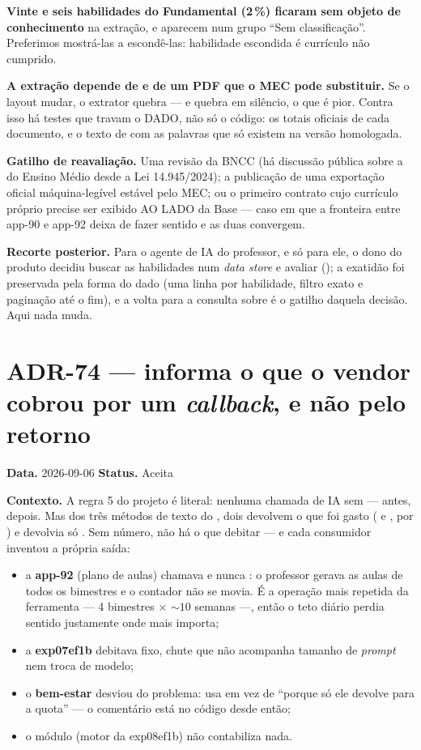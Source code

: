 \textbf{Vinte e seis habilidades do Fundamental (2\,\%) ficaram sem objeto de
conhecimento} na extração, e aparecem num grupo \enquote{Sem classificação}.
Preferimos mostrá-las a escondê-las: habilidade escondida é currículo não
cumprido.

\textbf{A extração depende de  e de um PDF que o MEC pode
substituir.} Se o layout mudar, o extrator quebra --- e quebra em silêncio, o
que é pior. Contra isso há testes que travam o DADO, não só o código: os totais
oficiais de cada documento, e o texto de  com as palavras que só
existem na versão homologada.

\textbf{Gatilho de reavaliação.} Uma revisão da BNCC (há discussão pública sobre
a do Ensino Médio desde a Lei 14.945/2024); a publicação de uma exportação
oficial máquina-legível estável pelo MEC; ou o primeiro contrato cujo currículo
próprio precise ser exibido AO LADO da Base --- caso em que a fronteira entre
app-90 e app-92 deixa de fazer sentido e as duas convergem.

\textbf{Recorte posterior.} Para o agente de IA do professor, e só para ele, o
dono do produto decidiu buscar as habilidades num \emph{data store} e avaliar
(); a exatidão foi preservada pela forma do dado (uma linha por
habilidade, filtro exato e paginação até o fim), e a volta para a consulta sobre
 é o gatilho daquela decisão. Aqui nada muda.
\section{ADR-74 ---  informa o que o vendor cobrou por um
\emph{callback}, e não pelo retorno}
\label{adr:74}

\textbf{Data.} 2026-09-06 \quad \textbf{Status.} Aceita

\textbf{Contexto.} A regra 5 do projeto é literal: nenhuma chamada de IA sem
 ---  antes,  depois. Mas dos três
métodos de texto do , dois devolvem o que foi gasto
( e , por ) e
 devolvia só . Sem número, não há o que debitar --- e
cada consumidor inventou a própria saída:

\begin{itemize}
  \item a \textbf{app-92} (plano de aulas) chamava  e nunca
    : o professor gerava as aulas de todos os bimestres e o
    contador não se movia. É a operação mais repetida da ferramenta --- 4
    bimestres $\times$ ${\sim}10$ semanas ---, então o teto diário perdia
    sentido justamente onde mais importa;
  \item a \textbf{exp07ef1b} debitava  fixo, chute que não acompanha
    tamanho de \emph{prompt} nem troca de modelo;
  \item o \textbf{bem-estar} desviou do problema: usa  em vez de
     \enquote{porque só ele devolve  para a
    quota} --- o comentário está no código desde então;
  \item o módulo  (motor da exp08ef1b) não contabiliza nada.
\end{itemize}

